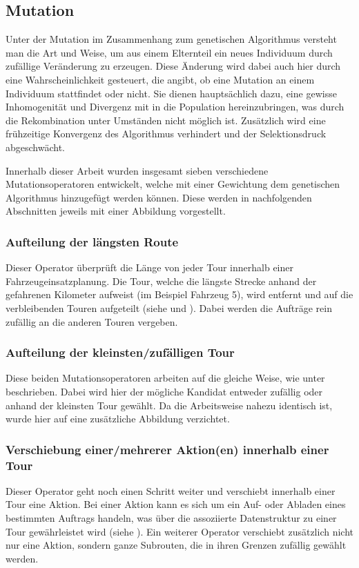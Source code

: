 \subsection{Mutation}
Unter der Mutation im Zusammenhang zum genetischen Algorithmus versteht man die Art und Weise, um aus einem Elternteil ein neues Individuum durch zufällige Veränderung zu erzeugen. Diese Änderung wird dabei auch hier durch eine Wahrscheinlichkeit gesteuert, die angibt, ob eine Mutation an einem Individuum stattfindet oder nicht. Sie dienen hauptsächlich dazu, eine gewisse Inhomogenität und Divergenz mit in die Population hereinzubringen, was durch die Rekombination unter Umständen nicht möglich ist. Zusätzlich wird eine frühzeitige Konvergenz des Algorithmus verhindert und der Selektionsdruck abgeschwächt. 

Innerhalb dieser Arbeit wurden insgesamt sieben verschiedene Mutationsoperatoren entwickelt, welche mit einer Gewichtung dem genetischen Algorithmus hinzugefügt werden können. Diese werden in nachfolgenden Abschnitten jeweils mit einer Abbildung vorgestellt.

\subsubsection{Aufteilung der längsten Route}
\label{sec:AufteilungLangaesteRoute}
Dieser Operator überprüft die Länge von jeder Tour innerhalb einer Fahrzeugeinsatzplanung. Die Tour, welche die längste Strecke anhand der gefahrenen Kilometer aufweist (im Beispiel Fahrzeug 5), wird entfernt und auf die verbleibenden Touren aufgeteilt (siehe  und ). Dabei werden die Aufträge rein zufällig an die anderen Touren vergeben.


\subsubsection{Aufteilung der kleinsten/zufälligen Tour}
Diese beiden Mutationsoperatoren arbeiten auf die gleiche Weise, wie unter  beschrieben. Dabei wird hier der mögliche Kandidat entweder zufällig oder anhand der kleinsten Tour gewählt. Da die Arbeitsweise nahezu identisch ist, wurde hier auf eine zusätzliche Abbildung verzichtet.

\subsubsection{Verschiebung einer/mehrerer Aktion(en) innerhalb einer Tour}
Dieser Operator geht noch einen Schritt weiter und verschiebt innerhalb einer Tour eine Aktion. Bei einer Aktion kann es sich um ein Auf- oder Abladen eines bestimmten Auftrags handeln, was über die assoziierte Datenstruktur zu einer Tour gewährleistet wird (siehe ). Ein weiterer Operator verschiebt zusätzlich nicht nur eine Aktion, sondern ganze Subrouten, die in ihren Grenzen zufällig gewählt werden.

